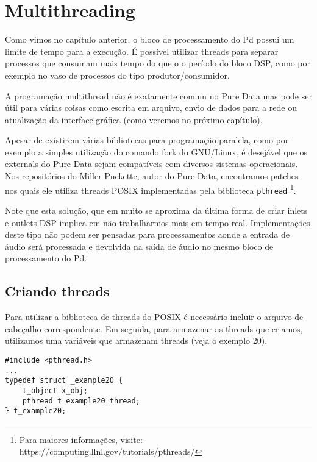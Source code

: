 
\chapter{Multithreading}

Como vimos no capítulo anterior, o bloco de processamento do Pd possui um
limite de tempo para a execução. É possível utilizar threads para separar
processos que consumam mais tempo do que o o período do bloco DSP, como por
exemplo no vaso de processos do tipo produtor/consumidor.

A programação multithread não é exatamente comum no Pure Data mas pode ser
útil para várias coisas como escrita em arquivo, envio de dados para a rede ou
atualização da interface gráfica (como veremos no próximo capítulo).

Apesar de existirem várias bibliotecas para programação paralela, como por
exemplo a simples utilização do comando fork do GNU/Linux, é desejável que os
externals do Pure Data sejam compatíveis com diversos sistemas operacionais.
Nos repositórios do Miller Puckette, autor do Pure Data, encontramos patches
nos quais ele utiliza threads POSIX implementadas pela biblioteca
\texttt{pthread} \footnote{Para maiores informações, visite:
https://computing.llnl.gov/tutorials/pthreads/}.

Note que esta solução, que em muito se aproxima da última forma de criar
inlets e outlets DSP implica em não trabalharmos mais em tempo real.
Implementações deste tipo não podem ser pensadas para processamentos aonde a
entrada de áudio será processada e devolvida na saída de áudio no mesmo bloco
de processamento do Pd.

\section{Criando threads}

Para utilizar a biblioteca de threads do POSIX é necessário incluir o arquivo
de cabeçalho correspondente. Em seguida, para armazenar as threads que
criamos, utilizamos uma variáveis que armazenam threads (veja o exemplo 20).

\begin{lstlisting}
#include <pthread.h>
...
typedef struct _example20 {
    t_object x_obj;
    pthread_t example20_thread;
} t_example20;

\end{lstlisting}

